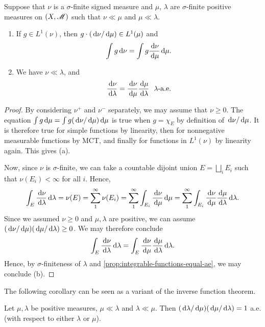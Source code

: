 \documentclass[12pt]{article} %
\begin{document}
\begin{proposition}\label{prop:chain-rule}
    Suppose that $\nu$ is a $\sigma$-finite signed measure and $\mu$, $\lambda$ are $\sigma$-finite positive measures on $(X, \mathscr{M})$ such that $\nu \ll \mu$ and $\mu \ll \lambda$. \begin{enumerate}
        \item If $g \in L^1(\nu)$, then $g \cdot (\, \mathrm{d}\nu/\, \mathrm{d}\mu) \in L^1(\mu)$ and \[\int g \, \mathrm{d} \nu = \int g \frac{\, \mathrm{d} \nu}{\, \mathrm{d}\mu}\, \mathrm{d}\mu.\]
        \item We have $\nu \ll \lambda$, and \[\frac{\d\nu}{\d\lambda} = \frac{\d\nu}{\d\mu} \frac{\d\mu}{\d\lambda} \ \ \lambda\text{-a.e.}\]
    \end{enumerate}
\end{proposition}

\begin{proof}
    By considering $\nu^+$ and $\nu^-$ separately, we may assume that $\nu \geq 0$. The equation $\int g \, \mathrm{d}\mu = \int g (\, \mathrm{d}\nu/\, \mathrm{d}\mu)\, \mathrm{d}\mu$ is true when $g = \chi_E$ by definition of $\, \mathrm{d}\nu/\, \mathrm{d}\mu$. It is therefore true for simple functions by linearity, then for nonnegative measurable functions by MCT, and finally for functions in $L^1(\nu)$ by linearity again. This gives (a).

    Now, since $\nu$ is $\sigma$-finite, we can take a countable dijoint union $E = \bigsqcup_i E_i$ such that $\nu(E_i) < \infty$ for all $i$. Hence, \[\int_E \frac{\, \mathrm{d}\nu}{\, \mathrm{d}\lambda}\, \mathrm{d}\lambda = \nu(E) = \sum_1^\infty \nu(E_i) = \sum_1^\infty \int_{E_i} \frac{\, \mathrm{d}\nu}{\, \mathrm{d}\mu}\, \mathrm{d}\mu = \sum_1^\infty \int_{E_i} \frac{\, \mathrm{d}\nu}{\, \mathrm{d}\mu} \frac{\, \mathrm{d}\mu}{\, \mathrm{d}\lambda} \, \mathrm{d}\lambda.\] Since we assumed $\nu \geq 0$ and $\mu, \lambda$ are positive, we can assume $(\, \mathrm{d}\nu/\, \mathrm{d}\mu)(\, \mathrm{d}\mu/\, \mathrm{d}\lambda) \geq 0$. We may therefore conclude \[\int_E \frac{\, \mathrm{d}\nu}{\, \mathrm{d}\lambda}\, \mathrm{d}\lambda = \int_E \frac{\, \mathrm{d}\nu}{\, \mathrm{d}\mu} \frac{\, \mathrm{d}\mu}{\, \mathrm{d}\lambda} \, \mathrm{d}\lambda.\] Hence, by $\sigma$-finiteness of $\lambda$ and \cref{prop:integrable-functions-equal-ae}, we may conclude (b).
\end{proof}

\noindent The following corollary can be seen as a variant of the inverse function theorem.

\begin{corollary}
    Let $\mu, \lambda$ be positive measures, $\mu \ll \lambda$ and $\lambda \ll \mu$. Then $(\, \mathrm{d}\lambda/\, \mathrm{d}\mu)(\, \mathrm{d}\mu/\, \mathrm{d}\lambda) = 1$ a.e. (with respect to either $\lambda$ or $\mu$).
\end{corollary}
\end{document}
